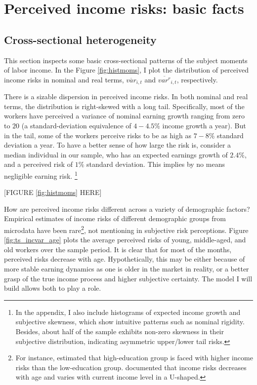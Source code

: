 \documentclass[12pt,notitlepage,onecolumn,aps,pra]{article}
\begin{document}
    \hypertarget{perceived-income-risks-basic-facts}{%
\section{Perceived income risks: basic
facts}\label{perceived-income-risks-basic-facts}}

\hypertarget{cross-sectional-heterogeneity}{%
\subsection{Cross-sectional
heterogeneity}\label{cross-sectional-heterogeneity}}

This section inspects some basic cross-sectional patterns of the subject
moments of labor income. In the Figure \ref{fig:histmoms}, I plot the
distribution of perceived income risks in nominal and real terms,
\(\overline{var}_{i,t}\) and \(\overline{var^{r}}_{i,t}\), respectively.

There is a sizable dispersion in perceived income risks. In both nominal
and real terms, the distribution is right-skewed with a long tail.
Specifically, most of the workers have perceived a variance of nominal
earning growth ranging from zero to \(20\) (a standard-deviation
equivalence of \(4-4.5\%\) income growth a year). But in the tail, some
of the workers perceive risks to be as high as \(7-8\%\) standard
deviation a year. To have a better sense of how large the risk is,
consider a median individual in our sample, who has an expected earnings
growth of \(2.4\%\), and a perceived risk of \(1\%\) standard deviation.
This implies by no means negligible earning risk.
\footnote{In the appendix, I also include histograms of expected income growth and subjective skewness, which show intuitive patterns such as nominal rigidity. Besides, about half of the sample exhibits non-zero skewness in their subjective distribution, indicating asymmetric upper/lower tail risks.}

\begin{center}
[FIGURE \ref{fig:histmoms} HERE]
\end{center}

How are perceived income risks different across a variety of demographic
factors? Empirical estimates of income risks of different demographic
groups from microdata have been
rare\footnote{For instance, \cite{meghir2004income} estimated that high-education group is faced with higher income risks than the low-education group.  \cite{bloom2018great} documented that income risks decreases with age and varies with current income level in a U-shaped.},
not mentioning in subjective risk perceptions. Figure
\ref{fig:ts_incvar_age} plots the average perceived risks of young,
middle-aged, and old workers over the sample period. It is clear that
for most of the months, perceived risks decrease with age.
Hypothetically, this may be either because of more stable earning
dynamics as one is older in the market in reality, or a better grasp of
the true income process and higher subjective certainty. The model I
will build allows both to play a role.
\end{document}
